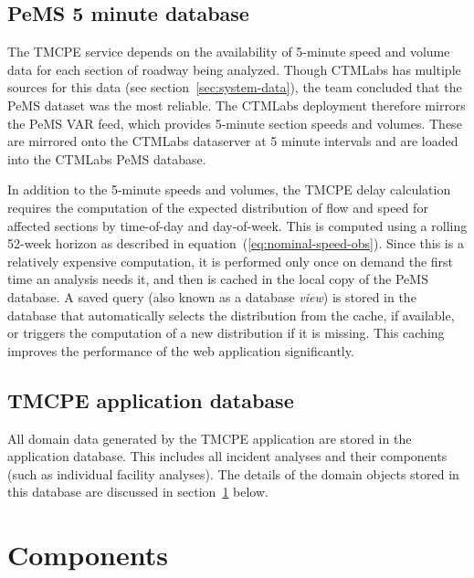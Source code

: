 \documentclass[12pt]{report}
\renewcommand{\fixme}[3][]{#1\xspace}
\newcounter{time}
\newcounter{space}
\begin{document}
\subsection{PeMS 5 minute database}
\label{sec:pems-5-min}

The \ac{TMCPE} service depends on the availability of 5-minute speed and volume
data for each section of roadway being analyzed.  Though \ac{CTMLabs} has
multiple sources for this data (see section~\ref{sec:system-data}), the team
concluded that the \ac{PeMS} dataset was the most reliable.  The \ac{CTMLabs}
deployment therefore mirrors the \ac{PeMS} \ac{VAR} feed, which provides
5-minute section speeds and volumes.  These are mirrored onto the \ac{CTMLabs}
dataserver at 5 minute intervals and are loaded into the \ac{CTMLabs} \ac{PeMS}
database.

In addition to the 5-minute speeds and volumes, the \ac{TMCPE} delay
calculation requires the computation of the expected distribution of
flow and speed for affected sections by time-of-day and day-of-week.
This is computed using a rolling 52-week horizon as described in
equation~(\ref{eq:nominal-speed-obs}).  Since this is a relatively
expensive computation, it is performed only once on demand the first
time an analysis needs it, and then is cached in the local copy of the
\ac{PeMS} database.  A saved query (also known as a database
\emph{view}) is stored in the database that automatically selects the
distribution from the cache, if available, or triggers the computation
of a new distribution if it is missing.  This caching improves the
performance of the web application significantly.


\subsection{TMCPE application database}
\label{sec:tmcpe-app-database}

All domain data generated by the \ac{TMCPE} application are stored in the
application database.  This includes all incident analyses and their components
(such as individual facility analyses).  The details of the domain objects
stored in this database are discussed in section~\ref{sec:components} below.


\section{Components}
\label{sec:components}
\end{document}
